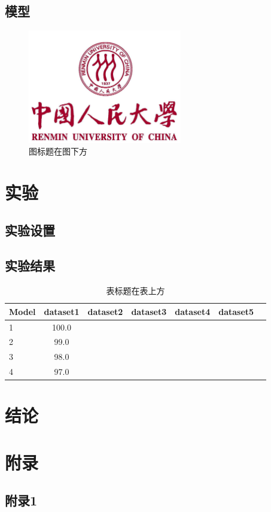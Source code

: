 \documentclass[12pt,punct=kaiming]{ctexart}
\begin{document}
\subsection{模型}

\begin{figure}[h]
    \centering
    \includegraphics[width=0.6\textwidth]{RucTextAssets/title.jpg}
    \caption{图标题在图下方}
    \label{fig:enter-label}
\end{figure}


\section{实验}

\subsection{实验设置}

\subsection{实验结果}

\begin{table}[h]
    \centering
    \caption{表标题在表上方}
    \begin{tabular}{@{}l|cccccc@{}}
    \toprule
    Model & dataset1 & dataset2 & dataset3 & dataset4 & dataset5 & \\
    \midrule
    1 & 100.0 & & & & & \\
    2 & 99.0 & & & & & \\
    3 & 98.0 & & & & & \\
    4 & 97.0 & & & & & \\
    \bottomrule
    \end{tabular}
    \label{tab:my_label}
\end{table}

\section{结论}

\newpage
{}



\newpage
{}
\section*{附录}
\appendix
\subsection*{附录1}
\end{document}
